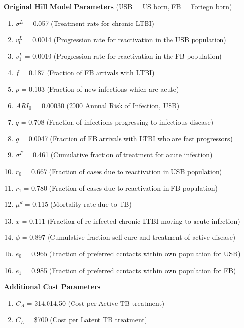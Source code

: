 \documentclass{amsart}
\begin{document}
\vspace{5mm}
{\bf Original Hill Model Parameters} 
(USB = US born, FB = Foriegn born)
\begin{enumerate}[1.] \itemsep 0em
\item{$\sigma^{L}$ = 0.057 (Treatment rate for chronic LTBI)}
\item{$v^{L}_{0}$   = 0.0014 (Progression rate for reactivation in the USB population)}
\item{$v^{L}_{1}$  = 0.0010 (Progression rate for reactivation in the FB population)}
\item{$f$                = 0.187 (Fraction of FB arrivals with LTBI)}
\item{$p$               = 0.103 (Fraction of new infections which are acute)}
\item{$ARI_{0}$     = 0.00030 (2000 Annual Risk of Infection, USB)}
\item{$q$               = 0.708 (Fraction of infections progressing to infectious disease)}
\item{$g$               = 0.0047 (Fraction of FB arrivals with LTBI who are fast progressors)}
\item{$\sigma^{F}$ = 0.461 (Cumulative fraction of treatment for acute infection)}
\item{$r_{0}$          = 0.667 (Fraction of cases due to reactivation in USB population)}
\item{$r_{1}$          = 0.780 (Fraction of cases due to reactivation in FB population)}
\item{$\mu^{d}$      = 0.115 (Mortality rate due to TB)}
\item{$x$                 = 0.111 (Fraction of re-infected chronic LTBI moving to acute infection)}
\item{$\phi$            = 0.897 (Cumulative fraction self-cure and treatment of active disease)}
\item{$e_{0}$          = 0.965 (Fraction of preferred contacts within own population for USB)}
\item{$e_{1}$          = 0.985 (Fraction of preferred contacts within own population for FB)}
\end{enumerate}
\vspace{2mm}
{\bf Additional Cost Parameters}
\begin{enumerate}[1.] \itemsep 0em
\item{$C_{A}$           = \$14,014.50 (Cost per Active TB treatment)}
\item{$C_{L}$           = \$700 (Cost per Latent TB treatment)}
\end{enumerate}
\vspace{5mm}
\end{document}
